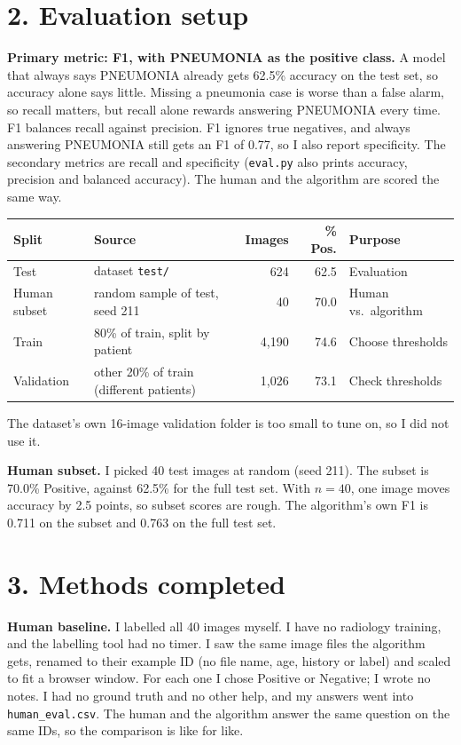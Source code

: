 \documentclass[11pt,letterpaper]{article}
\begin{document}
\section{2. Evaluation setup}

\textbf{Primary metric: F1, with PNEUMONIA as the positive class.} A model that always says PNEUMONIA already gets 62.5\% accuracy on the test set, so accuracy alone says little. Missing a pneumonia case is worse than a false alarm, so recall matters, but recall alone rewards answering PNEUMONIA every time. F1 balances recall against precision. F1 ignores true negatives, and always answering PNEUMONIA still gets an F1 of 0.77, so I also report specificity. The secondary metrics are recall and specificity (\texttt{eval.py} also prints accuracy, precision and balanced accuracy). The human and the algorithm are scored the same way.

\begin{tabularx}{\textwidth}{|l|Y|r|r|Y|}
\hline
\textbf{Split} & \textbf{Source} & \textbf{Images} & \textbf{\% Pos.} & \textbf{Purpose} \\ \hline
Test & dataset \texttt{test/} & 624 & 62.5 & Evaluation \\ \hline
Human subset & random sample of test, seed 211 & 40 & 70.0 & Human vs.\ algorithm \\ \hline
Train & 80\% of train, split by patient & 4,190 & 74.6 & Choose thresholds \\ \hline
Validation & other 20\% of train (different patients) & 1,026 & 73.1 & Check thresholds \\ \hline
\end{tabularx}

The dataset's own 16-image validation folder is too small to tune on, so I did not use it.

\textbf{Human subset.} I picked 40 test images at random (seed 211). The subset is 70.0\% Positive, against 62.5\% for the full test set. With $n = 40$, one image moves accuracy by 2.5 points, so subset scores are rough. The algorithm's own F1 is 0.711 on the subset and 0.763 on the full test set.

\section{3. Methods completed}

\textbf{Human baseline.} I labelled all 40 images myself. I have no radiology training, and the labelling tool had no timer. I saw the same image files the algorithm gets, renamed to their example ID (no file name, age, history or label) and scaled to fit a browser window. For each one I chose Positive or Negative; I wrote no notes. I had no ground truth and no other help, and my answers went into \texttt{human\_eval.csv}. The human and the algorithm answer the same question on the same IDs, so the comparison is like for like.
\end{document}
